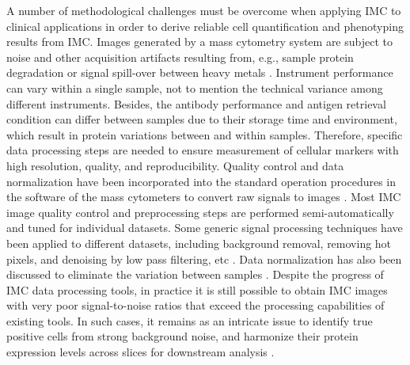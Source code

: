 \documentclass{mynature}
\begin{document}
A number of methodological challenges must be overcome when applying IMC to clinical applications in order to derive reliable cell quantification and phenotyping results from IMC. 
Images generated by a mass cytometry system are subject to noise and other acquisition artifacts resulting from, e.g., sample protein degradation or signal spill-over between heavy metals \cite{chevrier2018compensation}. 
Instrument performance can vary within a single sample, not to mention the technical variance among different instruments. 
Besides, the antibody performance and antigen retrieval condition can differ between samples due to their storage time and environment, which result in protein variations between and within samples.
Therefore, specific data processing steps are needed to ensure measurement of cellular markers with high resolution, quality, and reproducibility. 
Quality control and data normalization have been incorporated into the standard operation procedures in the software of the mass cytometers to convert raw signals to images \cite{lee2019acquisition}. 
Most IMC image quality control and preprocessing steps are performed semi-automatically and tuned for individual datasets. 
Some generic signal processing techniques have been applied to different datasets, including background removal, removing hot pixels, and denoising by low pass filtering, etc \cite{wang2019T1D, baharlou2019mass}. 
Data normalization has also been discussed to eliminate the variation between samples \cite{Ijs2020normalise, keren2018structured}. 
Despite the progress of IMC data processing tools, in practice it is still possible to obtain IMC images with very poor signal-to-noise ratios that exceed the processing capabilities of existing tools. In such cases, it remains as an intricate issue to identify true positive cells from strong background noise, and harmonize their protein expression levels across slices for downstream analysis .   

\end{document}
